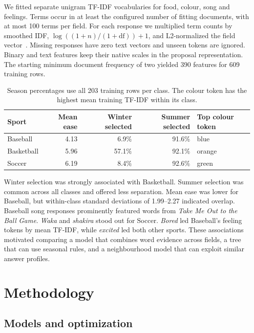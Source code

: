 \documentclass[12pt]{article}
\begin{document}
We fitted separate unigram TF-IDF vocabularies for food, colour, song and
feelings. Terms occur in at least the configured number of fitting documents,
with at most 100 terms per field. For each response we multiplied term counts
by smoothed IDF, $\log((1+n)/(1+\mathrm{df}))+1$, and L2-normalized the field
vector~\cite{skl-tfidf}. Missing responses have zero text vectors and unseen
tokens are ignored. Binary and text features keep their native scales in the
proposal representation. The starting minimum document frequency of two
yielded 390 features for 609 training rows.

\begin{table}[h]
\centering
\small
\begin{tabular}{lrrrl}
\toprule
Sport & Mean ease & Winter selected & Summer selected & Top colour token \\
\midrule
Baseball   & 4.13 & 6.9\%  & 91.6\% & blue \\
Basketball & 5.96 & 57.1\% & 92.1\% & orange \\
Soccer     & 6.19 & 8.4\%  & 92.6\% & green \\
\bottomrule
\end{tabular}
\caption{Season percentages use all 203 training rows per class. The colour
token has the highest mean training TF-IDF within its class.}
\label{tab:class-relationships}
\end{table}

Winter selection was strongly associated with Basketball. Summer selection was
common across all classes and offered less separation. Mean ease was lower for
Baseball, but within-class standard deviations of 1.99--2.27 indicated overlap.
Baseball song responses prominently featured words from \emph{Take Me Out to
the Ball Game}. \emph{Waka} and \emph{shakira} stood out for Soccer.
\emph{Bored} led Baseball's feeling tokens by mean TF-IDF, while
\emph{excited} led both other sports. These associations motivated comparing a
model that combines word evidence across fields, a tree that can use seasonal
rules, and a neighbourhood model that can exploit similar answer profiles.

\section{Methodology}\label{sec:methodology}

\subsection*{Models and optimization}
\end{document}
